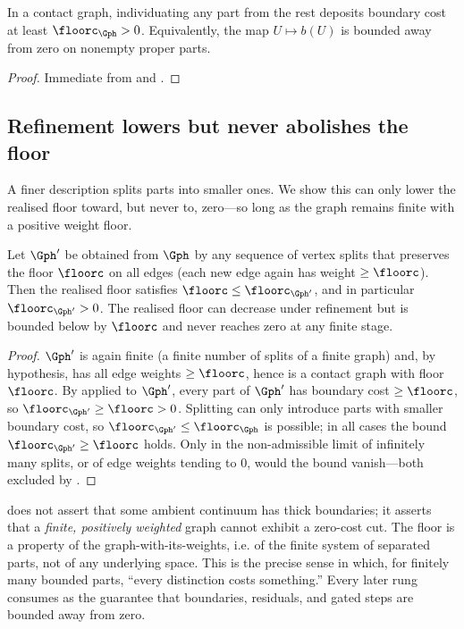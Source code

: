 \begin{corollary}
\label{cor:no-zero}
In a contact graph, individuating any part from the rest deposits boundary cost
at least $\floorc_\Gph>0$. Equivalently, the map $U\mapsto b(U)$ is bounded
away from zero on nonempty proper parts.
\end{corollary}

\begin{proof}
Immediate from  and .
\end{proof}

\subsection{Refinement lowers but never abolishes the floor}

A finer description splits parts into smaller ones. We show this can only lower
the realised floor toward, but never to, zero---so long as the graph remains
finite with a positive weight floor.

\begin{proposition}
\label{prop:refine}
Let $\Gph'$ be obtained from $\Gph$ by any sequence of vertex splits that
preserves the floor $\floorc$ on all edges \textup{(}each new edge again has
weight $\ge\floorc$\textup{)}. Then the realised floor satisfies
$\floorc\le\floorc_{\Gph'}$, and in particular $\floorc_{\Gph'}>0$. The realised
floor can decrease under refinement but is bounded below by $\floorc$ and never
reaches zero at any finite stage.
\end{proposition}

\begin{proof}
$\Gph'$ is again finite (a finite number of splits of a finite graph) and, by
hypothesis, has all edge weights $\ge\floorc$, hence is a contact graph with
floor $\floorc$. By  applied to $\Gph'$, every part of $\Gph'$
has boundary cost $\ge\floorc$, so $\floorc_{\Gph'}\ge\floorc>0$. Splitting can
only introduce parts with smaller boundary cost, so $\floorc_{\Gph'}\le
\floorc_\Gph$ is possible; in all cases the bound $\floorc_{\Gph'}\ge\floorc$
holds. Only in the non-admissible limit of infinitely many splits, or of edge
weights tending to $0$, would the bound vanish---both excluded by
.
\end{proof}

\begin{remark}
\label{rem:floor-scope}
 does not assert that some ambient continuum has thick
boundaries; it asserts that a \emph{finite, positively weighted} graph cannot
exhibit a zero-cost cut. The floor is a property of the graph-with-its-weights,
i.e. of the finite system of separated parts, not of any underlying space. This
is the precise sense in which, for finitely many bounded parts, ``every
distinction costs something.'' Every later rung consumes  as the
guarantee that boundaries, residuals, and gated steps are bounded away from
zero.
\end{remark}
